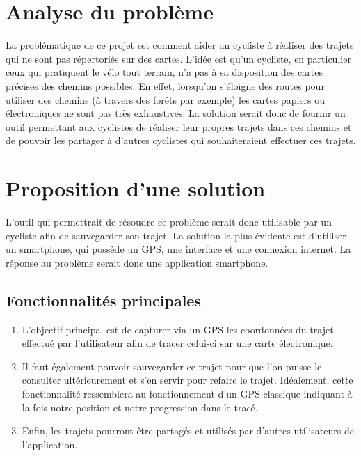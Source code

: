 \section{Analyse du problème}
La problématique de ce projet est comment aider un cycliste à réaliser des trajets qui ne sont pas répertoriés sur des cartes. L'idée est qu'un cycliste, 
en particulier ceux qui pratiquent le vélo tout terrain, n'a pas à sa disposition des cartes précises des chemins possibles. En effet,
lorsqu'on s'éloigne des routes pour utiliser des chemins (à travers des forêts par exemple) les cartes papiers ou électroniques ne sont pas
très exhaustives. La solution serait donc de fournir un outil permettant aux cyclistes de réaliser leur propres trajets dans ces
chemins et de pouvoir les partager à d'autres cyclistes qui souhaiteraient effectuer ces trajets.

\section{Proposition d'une solution}
L'outil qui permettrait de résoudre ce problème serait donc utilisable par un cycliste afin de sauvegarder son trajet. La solution la plus évidente
est d'utiliser un smartphone, qui possède un GPS, une interface et une connexion internet. La réponse au problème serait donc une application
smartphone.

\subsection{Fonctionnalités principales}
\begin{enumerate}
  \item L'objectif principal est de capturer via un GPS les coordonnées du trajet effectué par l'utilisateur afin de tracer celui-ci sur une carte
  électronique.
  \item Il faut également pouvoir sauvegarder ce trajet pour que l'on puisse le consulter ultérieurement et s'en servir pour refaire le trajet.
  Idéalement, cette fonctionnalité ressemblera au fonctionnement d'un GPS classique indiquant à la fois notre position et notre progression dans le tracé.
  \item Enfin, les trajets pourront être partagés et utilisés par d'autres utilisateurs de l'application.
\end{enumerate}


